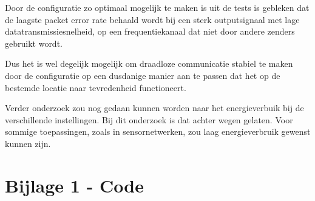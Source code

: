 \documentclass[a4paper,10pt]{article}
\begin{document}
Door de configuratie zo optimaal mogelijk te maken is uit de tests is gebleken dat de laagste packet error rate behaald wordt bij een sterk outputsignaal met lage datatransmissiesnelheid, op een frequentiekanaal dat niet door andere zenders gebruikt wordt.

Dus het is wel degelijk mogelijk om draadloze communicatie stabiel te maken door de configuratie op een dusdanige manier aan te passen dat het op de bestemde locatie naar tevredenheid functioneert.

Verder onderzoek zou nog gedaan kunnen worden naar het energieverbuik bij de verschillende instellingen. Bij dit onderzoek is dat achter wegen gelaten. Voor sommige toepassingen, zoals in sensornetwerken, zou laag energieverbruik gewenst kunnen zijn.

\newpage
\appendix
\section{Bijlage 1 - Code}
\label{sec:code}

\end{document}
